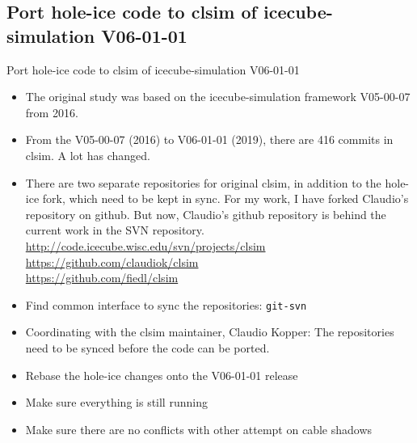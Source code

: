 \subsection{\inprogress Port hole-ice code to clsim of icecube-simulation V06-01-01}
\begin{frame}{\inprogress Port hole-ice code to clsim of icecube-simulation V06-01-01}
  \begin{itemize}
    \item The original study was based on the icecube-simulation framework V05-00-07 from 2016.
    \item From the V05-00-07 (2016) to V06-01-01 (2019), there are 416 commits in clsim. A lot has changed.
    \item There are two separate repositories for original clsim, in addition to the hole-ice fork, which need to be kept in sync. For my work, I have forked Claudio's repository on github. But now, Claudio's github repository is behind the current work in the SVN repository. \\
      \url{http://code.icecube.wisc.edu/svn/projects/clsim} \\
      \url{https://github.com/claudiok/clsim} \\
      \url{https://github.com/fiedl/clsim}
    \item[\done] Find common interface to sync the repositories: \texttt{git-svn}
    \item[\inprogress] Coordinating with the clsim maintainer, Claudio Kopper: The repositories need to be synced before the code can be ported.
    \item[\tobedone] Rebase the hole-ice changes onto the V06-01-01 release
    \item[\tobedone] Make sure everything is still running
    \item[\tobedone] Make sure there are no conflicts with other attempt on cable shadows
  \end{itemize}
\end{frame}

